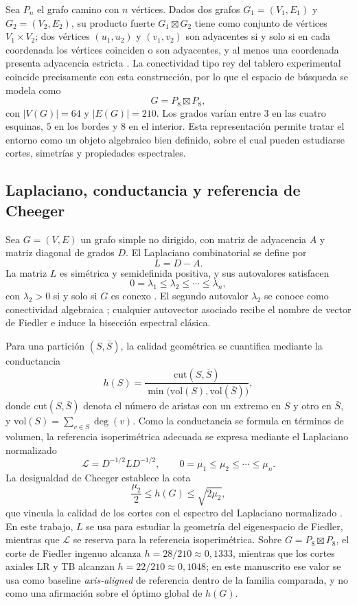 \documentclass[journal]{IEEEtran}
\newcommand{\vol}{\mathrm{vol}}
\newcommand{\cut}{\mathrm{cut}}
\begin{document}
Sea $P_n$ el grafo camino con $n$ vértices. Dados dos grafos $G_1=(V_1,E_1)$ y $G_2=(V_2,E_2)$, su producto fuerte $G_1 \boxtimes G_2$ tiene como conjunto de vértices $V_1\times V_2$; dos vértices $(u_1,u_2)$ y $(v_1,v_2)$ son adyacentes si y solo si en cada coordenada los vértices coinciden o son adyacentes, y al menos una coordenada presenta adyacencia estricta \cite{hammack2011}. La conectividad tipo rey del tablero experimental coincide precisamente con esta construcción, por lo que el espacio de búsqueda se modela como
\[
G = P_8 \boxtimes P_8,
\]
con $|V(G)|=64$ y $|E(G)|=210$. Los grados varían entre $3$ en las cuatro esquinas, $5$ en los bordes y $8$ en el interior. Esta representación permite tratar el entorno como un objeto algebraico bien definido, sobre el cual pueden estudiarse cortes, simetrías y propiedades espectrales.

\subsection{Laplaciano, conductancia y referencia de Cheeger}

Sea $G=(V,E)$ un grafo simple no dirigido, con matriz de adyacencia $A$ y matriz diagonal de grados $D$. El Laplaciano combinatorial se define por
\[
L = D - A.
\]
La matriz $L$ es simétrica y semidefinida positiva, y sus autovalores satisfacen
\[
0 = \lambda_1 \le \lambda_2 \le \cdots \le \lambda_n,
\]
con $\lambda_2 > 0$ si y solo si $G$ es conexo \cite{chung1997,vonluxburg2007}. El segundo autovalor $\lambda_2$ se conoce como conectividad algebraica \cite{fiedler1973,mohar1991}; cualquier autovector asociado recibe el nombre de vector de Fiedler e induce la bisección espectral clásica.

Para una partición $(S,\bar S)$, la calidad geométrica se cuantifica mediante la conductancia
\begin{equation}
h(S) = \frac{\cut(S,\bar S)}{\min\bigl(\vol(S),\vol(\bar S)\bigr)},
\label{eq:conductance}
\end{equation}
donde $\cut(S,\bar S)$ denota el número de aristas con un extremo en $S$ y otro en $\bar S$, y $\vol(S)=\sum_{v\in S}\deg(v)$. Como la conductancia se formula en términos de volumen, la referencia isoperimétrica adecuada se expresa mediante el Laplaciano normalizado
\[
\mathcal{L} = D^{-1/2} L D^{-1/2}, \qquad 0 = \mu_1 \le \mu_2 \le \cdots \le \mu_n.
\]
La desigualdad de Cheeger establece la cota
\begin{equation}
\frac{\mu_2}{2} \le h(G) \le \sqrt{2\mu_2},
\label{eq:cheeger}
\end{equation}
que vincula la calidad de los cortes con el espectro del Laplaciano normalizado \cite{chung1997,cheeger1970}. En este trabajo, $L$ se usa para estudiar la geometría del eigenespacio de Fiedler, mientras que $\mathcal{L}$ se reserva para la referencia isoperimétrica. Sobre $G = P_8 \boxtimes P_8$, el corte de Fiedler ingenuo alcanza $h = 28/210 \approx 0{,}1333$, mientras que los cortes axiales LR y TB alcanzan $h = 22/210 \approx 0{,}1048$; en este manuscrito ese valor se usa como baseline \emph{axis-aligned} de referencia dentro de la familia comparada, y no como una afirmación sobre el óptimo global de $h(G)$.
\end{document}
